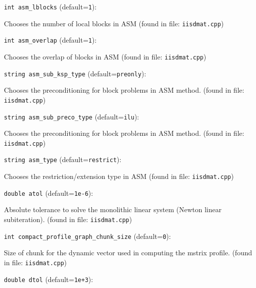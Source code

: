 \item\verb+int asm_lblocks+ {\rm(default=\verb|1|)}:

Chooses the number of local blocks in ASM
 (found in file: \verb+iisdmat.cpp+)
\item\verb+int asm_overlap+ {\rm(default=\verb|1|)}:

Chooses the overlap of blocks in ASM
 (found in file: \verb+iisdmat.cpp+)
\item\verb+string asm_sub_ksp_type+ {\rm(default=\verb|preonly|)}:

Chooses the preconditioning for block problems in ASM method.
 (found in file: \verb+iisdmat.cpp+)
\item\verb+string asm_sub_preco_type+ {\rm(default=\verb|ilu|)}:

Chooses the preconditioning for block problems in ASM method.
 (found in file: \verb+iisdmat.cpp+)
\item\verb+string asm_type+ {\rm(default=\verb|restrict|)}:

Chooses the restriction/extension type in ASM
 (found in file: \verb+iisdmat.cpp+)
\item\verb+double atol+ {\rm(default=\verb|1e-6|)}:

Absolute tolerance to solve the monolithic linear
system (Newton linear subiteration).
 (found in file: \verb+iisdmat.cpp+)
\item\verb+int compact_profile_graph_chunk_size+ {\rm(default=\verb|0|)}:

Size of chunk for the dynamic vector used in computing the
mstrix profile. 
 (found in file: \verb+iisdmat.cpp+)
\item\verb+double dtol+ {\rm(default=\verb|1e+3|)}:

